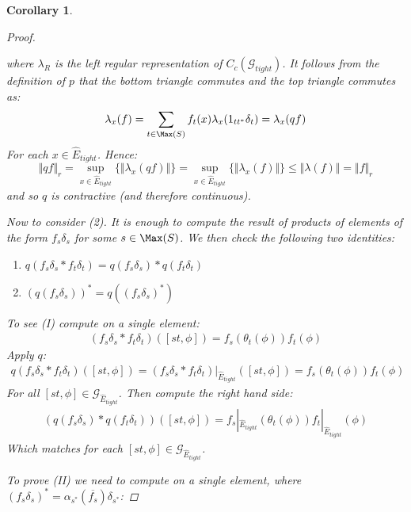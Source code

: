 \documentclass[11pt]{amsart}
\theoremstyle{plain}
\newtheorem{corollary}[theorem]{Corollary}%
\theoremstyle{definition}%
\theoremstyle{remark}%
\newcommand{\G}{\mathcal{G}}
\newcommand{\E}{\widehat{E}}
\begin{document}
\begin{corollary}
\begin{proof}
\begin{center}
\begin{tikzpicture}
\end{tikzpicture}
\end{center}

where $\lambda_{R}$ is the left regular representation of $C_{c}(\G_{tight})$. It follows from the definition of $p$ that the bottom triangle commutes and the top triangle commutes as:
\begin{equation*}
\lambda_{x}(f) =\sum_{t \in \Max(S)} f_{t}(x)\lambda_{x}(1_{tt^{*}}\delta_{t}) = \lambda_{x}(qf)
\end{equation*}
For each $x \in \E_{tight}$. Hence:
\begin{equation*}
\Vert qf \Vert_{r} = \sup_{x \in \E_{tight}} \lbrace \Vert \lambda_{x}(qf) \Vert \rbrace = \sup_{x \in \E_{tight}} \lbrace \Vert \lambda_{x}(f) \Vert \rbrace \leq \Vert \lambda(f) \Vert = \Vert f \Vert_{r}
\end{equation*}
and so $q$ is contractive (and therefore continuous).
 
Now to consider (2). It is enough to compute the result of products of elements of the form $f_{s}\delta_{s}$ for some $s \in \Max(S)$. We then check the following two identities:


\begin{enumerate}[I]
\item $q(f_{s}\delta_{s} \ast f_{t}\delta_{t}) = q(f_{s}\delta_{s})\ast q(f_{t}\delta_{t})$
\item $(q(f_{s}\delta_{s}))^{*}=q((f_{s}\delta_{s})^{*})$
\end{enumerate}


To see (I) compute on a single element:
\begin{eqnarray*}
(f_{s}\delta_{s} \ast f_{t}\delta_{t})([st,\phi])=f_{s}(\theta_{t}(\phi))f_{t}(\phi)
\end{eqnarray*}
Apply $q$:
\begin{eqnarray*}
q(f_{s}\delta_{s} \ast f_{t}\delta_{t})([st,\phi])= (f_{s}\delta_{s} \ast f_{t}\delta_{t})|_{\E_{tight}}([st,\phi]) =f_{s}(\theta_{t}(\phi))f_{t}(\phi)
\end{eqnarray*}
For all $[st,\phi] \in \G_{\E_{tight}}$. Then compute the right hand side: 
\begin{eqnarray*}
(q(f_{s}\delta_{s}) \ast q(f_{t}\delta_{t}))([st,\phi])=f_{s}|_{\E_{tight}}(\theta_{t}(\phi))f_{t}|_{\E_{tight}}(\phi)
\end{eqnarray*}
Which matches for each $[st,\phi] \in \G_{\E_{tight}}$. 

To prove (II) we need to compute on a single element, where $(f_{s}\delta_{s})^{*}=\alpha_{s^{*}}(\overline{f_{s}})\delta_{s^{*}}$:


\end{proof}
\end{corollary}
\end{document}
